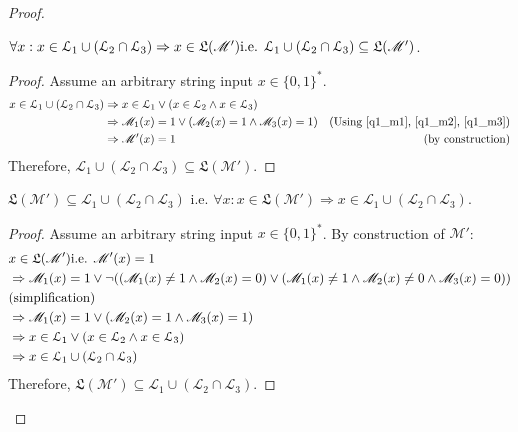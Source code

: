 \documentclass[usletter]{article}
\newcommand {\langset}[1]      {\ensuremath{\mathcal{#1}}}
\newcommand {\machine}[1]      {\ensuremath{\mathscr{#1}}}
\newcommand {\langfunc}        {\ensuremath{\mathfrak{L}}}
\newcommand{\ie}{\textnormal{i.e. }}
\newcommand {\langL}          {\langset{L}}
\newcommand {\machineM}       {\machine{M}}
\newcommand {\allstrings}     {\ensuremath{\{0,1\}^*}}
\begin{document}
\begin{enumerate}[labelsep=2.5em, label=\textbf{\arabic{enumi}}]
\begin{proof}
    \begin{claim}
      $\forall x : x \in \langL_1 \cup (\langL_2 \cap \langL_3)
                  \Rightarrow x \in \langfunc(\machineM') \ie
        \langL_1 \cup (\langL_2 \cap \langL_3) \subseteq \langfunc(\machineM')$.
    \end{claim}
    \begin{proof}
      Assume an arbitrary string input $x \in \allstrings$.
      \begin{align*}
        x \in \langL_1 \cup (\langL_2 \cap \langL_3)
          &\Rightarrow x \in \langL_1
              \vee (x \in \langL_2 \wedge x \in \langL_3) \\
          &\Rightarrow \machineM_1(x) = 1
            \vee (\machineM_2(x) = 1 \wedge \machineM_3(x) = 1)
            & \textnormal{(Using \ref{q1_m1}, \ref{q1_m2}, \ref{q1_m3})} \\
          &\Rightarrow \machineM'(x) = 1 & \textnormal{(by construction)}
      \end{align*}
      Therefore,
      $\langL_1 \cup (\langL_2 \cap \langL_3) \subseteq \langfunc(\machineM')$.
    \end{proof}

    \begin{claim}
      $\langfunc(\machineM') \subseteq \langL_1 \cup (\langL_2 \cap \langL_3)$
      \ie $\forall x : x \in \langfunc(\machineM')
                      \Rightarrow x \in \langL_1 \cup (\langL_2 \cap \langL_3)$.
    \end{claim}
    \begin{proof}
      Assume an arbitrary string input $x \in \allstrings$.
      By construction of $\machineM'$:
      \begin{align*}
        &x \in \langfunc(\machineM') \ie \machineM'(x) = 1 \\
        &\Rightarrow \machineM_1(x) = 1
          \vee \neg ((\machineM_1(x) \neq 1 \wedge \machineM_2(x) = 0)
                     \vee (\machineM_1(x) \neq 1 \wedge \machineM_2(x) \neq 0
                                                 \wedge \machineM_3(x) = 0)) \\
        &\textnormal{(simplification)} \\
        &\Rightarrow \machineM_1(x) = 1
          \vee (\machineM_2(x) = 1 \wedge \machineM_3(x) = 1) \\
        &\Rightarrow x \in \langL_1
          \vee (x \in \langL_2 \wedge x \in \langL_3) \\
        &\Rightarrow x \in \langL_1 \cup (\langL_2 \cap \langL_3)
      \end{align*}
      Therefore,
      $\langfunc(\machineM') \subseteq \langL_1 \cup (\langL_2 \cap \langL_3)$.
    \end{proof}


\end{proof}
\end{enumerate}
\end{document}
